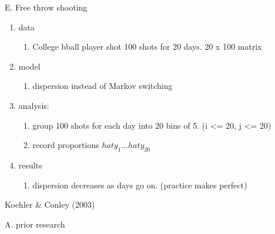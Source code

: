 \documentclass[12pt,twoside]{dukestatscithesis}
\providecommand{\tightlist}{%
  \setlength{\itemsep}{0pt}\setlength{\parskip}{0pt}}
\theoremstyle{definition}
\theoremstyle{definition}
\theoremstyle{definition}
\theoremstyle{remark}
\begin{document}
E. Free throw shooting
\begin{enumerate}
\def\labelenumi{\arabic{enumi}.}
\tightlist
\item
  data
  \begin{enumerate}
  \def\labelenumii{\alph{enumii}.}
  \tightlist
  \item
    College bball player shot 100 shots for 20 days. 20 x 100 matrix
  \end{enumerate}
\item
  model
  \begin{enumerate}
  \def\labelenumii{\alph{enumii}.}
  \tightlist
  \item
    dispersion instead of Markov switching
  \end{enumerate}
\item
  analysis:
  \begin{enumerate}
  \def\labelenumii{\alph{enumii}.}
  \tightlist
  \item
    group 100 shots for each day into 20 bins of 5. (i \textless{}= 20,
    j \textless{}= 20)
  \item
    record proportions \(hat{y_{1}}...hat{y_20}\)
  \end{enumerate}
\item
  results
  \begin{enumerate}
  \def\labelenumii{\alph{enumii}.}
  \tightlist
  \item
    dispersion decreases as days go on. (practice makes perfect)
  \end{enumerate}
\end{enumerate}
Koehler \& Conley (2003)

A. prior research
\end{document}
